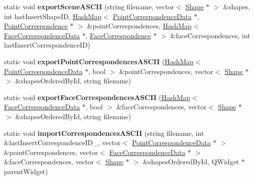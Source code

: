 \begin{DoxyCompactItemize}
\item 
\hypertarget{class_scene_writer_reader_a035bfd2f7adfe4c736d77311aca761da}{}static void {\bfseries export\+Scene\+A\+S\+C\+I\+I} (string filename, vector$<$ \hyperlink{class_shape}{Shape} $\ast$ $>$ \&shapes, int last\+Insert\+Shape\+I\+D, \hyperlink{class_hash_map}{Hash\+Map}$<$ \hyperlink{class_point_correspondence_data}{Point\+Correspondence\+Data} $\ast$, \hyperlink{class_point_correspondence}{Point\+Correspondence} $\ast$ $>$ \&point\+Correspondences, \hyperlink{class_hash_map}{Hash\+Map}$<$ \hyperlink{class_face_correspondence_data}{Face\+Correspondence\+Data} $\ast$, \hyperlink{class_face_correspondence}{Face\+Correspondence} $\ast$ $>$ \&face\+Correspondences, int last\+Insert\+Correspondence\+I\+D)\label{class_scene_writer_reader_a035bfd2f7adfe4c736d77311aca761da}

\item 
\hypertarget{class_scene_writer_reader_a68b6a5b9fc0ba76a0c873e351154994e}{}static void {\bfseries export\+Point\+Correspondences\+A\+S\+C\+I\+I} (\hyperlink{class_hash_map}{Hash\+Map}$<$ \hyperlink{class_point_correspondence_data}{Point\+Correspondence\+Data} $\ast$, bool $>$ \&point\+Correspondences, vector$<$ \hyperlink{class_shape}{Shape} $\ast$ $>$ \&shapes\+Ordered\+By\+Id, string filename)\label{class_scene_writer_reader_a68b6a5b9fc0ba76a0c873e351154994e}

\item 
\hypertarget{class_scene_writer_reader_aac58f559b254213c548b3e48fd88f647}{}static void {\bfseries export\+Face\+Correspondences\+A\+S\+C\+I\+I} (\hyperlink{class_hash_map}{Hash\+Map}$<$ \hyperlink{class_face_correspondence_data}{Face\+Correspondence\+Data} $\ast$, bool $>$ \&face\+Correspondences, vector$<$ \hyperlink{class_shape}{Shape} $\ast$ $>$ \&shapes\+Ordered\+By\+Id, string filename)\label{class_scene_writer_reader_aac58f559b254213c548b3e48fd88f647}

\item 
\hypertarget{class_scene_writer_reader_a2501e8be6b5d63cf57ada72be062a710}{}static void {\bfseries import\+Correspondences\+A\+S\+C\+I\+I} (string filename, int \&last\+Insert\+Correspondence\+I\+D\+\_\+, vector$<$ \hyperlink{class_point_correspondence_data}{Point\+Correspondence\+Data} $\ast$ $>$ \&point\+Correspondences, vector$<$ \hyperlink{class_face_correspondence_data}{Face\+Correspondence\+Data} $\ast$ $>$ \&face\+Correspondences, vector$<$ \hyperlink{class_shape}{Shape} $\ast$ $>$ \&shapes\+Ordered\+By\+Id, Q\+Widget $\ast$parent\+Widget)\label{class_scene_writer_reader_a2501e8be6b5d63cf57ada72be062a710}


\end{DoxyCompactItemize}
